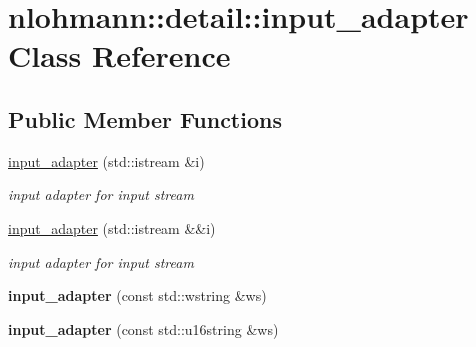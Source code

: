 \hypertarget{classnlohmann_1_1detail_1_1input__adapter}{}\section{nlohmann\+:\+:detail\+:\+:input\+\_\+adapter Class Reference}
\label{classnlohmann_1_1detail_1_1input__adapter}
\subsection*{Public Member Functions}
\begin{DoxyCompactItemize}
\item 
\mbox{\label{classnlohmann_1_1detail_1_1input__adapter_ae89f11268d4724b3080473f7218abe86}} 
\mbox{\hyperlink{classnlohmann_1_1detail_1_1input__adapter_ae89f11268d4724b3080473f7218abe86}{input\+\_\+adapter}} (std\+::istream \&i)
\begin{DoxyCompactList}\small\item\em input adapter for input stream \end{DoxyCompactList}\item 
\mbox{\label{classnlohmann_1_1detail_1_1input__adapter_af002dd2e53ac0855a03cb68d0ce626b2}} 
\mbox{\hyperlink{classnlohmann_1_1detail_1_1input__adapter_af002dd2e53ac0855a03cb68d0ce626b2}{input\+\_\+adapter}} (std\+::istream \&\&i)
\begin{DoxyCompactList}\small\item\em input adapter for input stream \end{DoxyCompactList}\item 
\mbox{\label{classnlohmann_1_1detail_1_1input__adapter_a32f5ddd06562edce43ee86f5b5c2031b}} 
{\bfseries input\+\_\+adapter} (const std\+::wstring \&ws)
\item 
\mbox{\label{classnlohmann_1_1detail_1_1input__adapter_a58163eaa485b17dd878d3c782efc1e43}} 
{\bfseries input\+\_\+adapter} (const std\+::u16string \&ws)
\item 
\mbox{\label{classnlohmann_1_1detail_1_1input__adapter_abe0015ae09e855f502620315b9dcc3db}} 

\end{DoxyCompactItemize}

